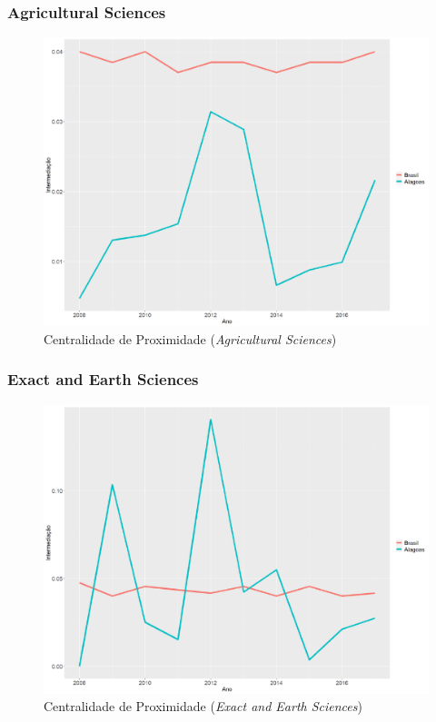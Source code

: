 \subsubsection{Agricultural Sciences}

\begin{figure}[H]
	\centering
	\includegraphics[scale=0.6]{Imagens/agricultural/graf-linha-betweeness-br-al.pdf}
	\caption{Centralidade de Proximidade (\textit{Agricultural Sciences})}
	\label{between-agri}
\end{figure}

\subsubsection{Exact and Earth Sciences}

\begin{figure}[H]
	\centering
	\includegraphics[scale=0.6]{Imagens/exact/graf-linha-betweeness-br-al.pdf}
	\caption{Centralidade de Proximidade (\textit{Exact and Earth Sciences})}
	\label{between-exact}
\end{figure}

